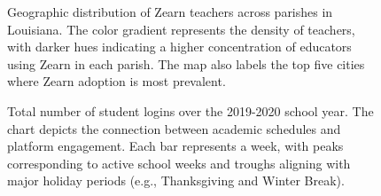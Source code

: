 \documentclass[
  number,
  preprint,
  3p,
  onecolumn]{elsarticle}
\begin{document}
\begin{figure}


\caption{\label{fig-teachers-map}Geographic distribution of Zearn
teachers across parishes in Louisiana. The color gradient represents the
density of teachers, with darker hues indicating a higher concentration
of educators using Zearn in each parish. The map also labels the top
five cities where Zearn adoption is most prevalent.}

\end{figure}%

\begin{figure}


\caption{\label{fig-logins-week}Total number of student logins over the
2019-2020 school year. The chart depicts the connection between academic
schedules and platform engagement. Each bar represents a week, with
peaks corresponding to active school weeks and troughs aligning with
major holiday periods (e.g., Thanksgiving and Winter Break).}

\end{figure}%
\end{document}
